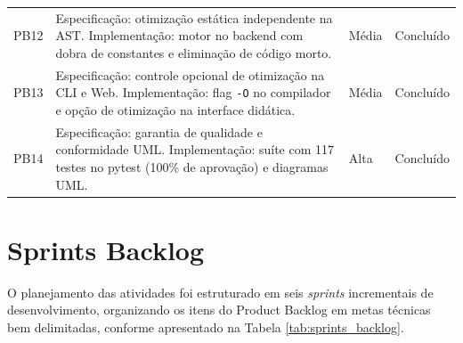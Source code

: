 \begin{table}[htbp]
\begin{tabular}{p{1.2cm}p{9.4cm}p{1.8cm}p{1.8cm}}
PB12 & Especificação: otimização estática independente na AST. Implementação: motor no backend com dobra de constantes e eliminação de código morto. & Média & Concluído \\
PB13 & Especificação: controle opcional de otimização na CLI e Web. Implementação: flag \texttt{-O} no compilador e opção de otimização na interface didática. & Média & Concluído \\
PB14 & Especificação: garantia de qualidade e conformidade UML. Implementação: suíte com 117 testes no pytest (100\% de aprovação) e diagramas UML. & Alta & Concluído \\
\bottomrule
\end{tabular}
\end{table}

\section{Sprints Backlog}

O planejamento das atividades foi estruturado em seis \textit{sprints} incrementais de desenvolvimento, organizando os itens do Product Backlog em metas técnicas bem delimitadas, conforme apresentado na Tabela \ref{tab:sprints_backlog}.


